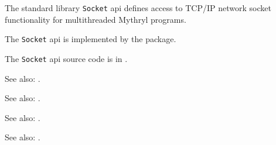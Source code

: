 
The standard library {\tt Socket} api defines access to {\sc TCP/IP} network socket functionality for multithreaded Mythryl programs.

The {\tt Socket} api is implemented by the  package.

The {\tt Socket} api source code is in .

See also: .

See also:  .

See also:  .

See also:  .
